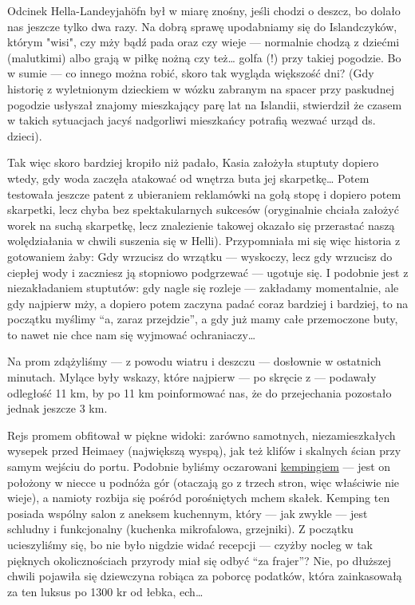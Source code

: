 
Odcinek Hella-Landeyjahöfn był w miarę znośny, jeśli chodzi o deszcz, bo dolało nas jeszcze tylko dwa razy. Na dobrą sprawę upodabniamy się do Islandczyków, którym "wisi", czy mży bądź pada oraz czy wieje --- normalnie chodzą z dziećmi (malutkimi) albo grają w piłkę nożną czy też… golfa (!) przy takiej pogodzie. Bo w sumie --- co innego można robić, skoro tak wygląda większość dni? (Gdy historię z wyletnionym dzieckiem w wózku zabranym na spacer przy paskudnej pogodzie usłyszał znajomy mieszkający parę lat na Islandii, stwierdził że czasem w takich sytuacjach jacyś nadgorliwi mieszkańcy potrafią wezwać urząd ds. dzieci).

Tak więc skoro bardziej kropiło niż padało, Kasia założyła stuptuty dopiero wtedy, gdy woda zaczęła atakować od wnętrza buta jej skarpetkę… Potem testowała jeszcze patent z ubieraniem reklamówki na gołą stopę i dopiero potem skarpetki, lecz chyba bez spektakularnych sukcesów (oryginalnie chciała założyć worek na suchą skarpetkę, lecz znalezienie takowej okazało się przerastać naszą wolędziałania w chwili suszenia się w Helli). Przypomniała mi się więc historia z gotowaniem żaby: Gdy wrzucisz do wrzątku --- wyskoczy, lecz gdy wrzucisz do ciepłej wody i zaczniesz ją stopniowo podgrzewać --- ugotuje się. I podobnie jest z niezakładaniem stuptutów: gdy nagle się rozleje --- zakładamy momentalnie, ale gdy najpierw mży, a dopiero potem zaczyna padać coraz bardziej i bardziej, to na początku myślimy “a, zaraz przejdzie”, a gdy już mamy całe przemoczone buty, to nawet nie chce nam się wyjmować ochraniaczy…

Na prom zdążyliśmy --- z powodu wiatru i deszczu --- dosłownie w ostatnich minutach. Mylące były wskazy, które najpierw --- po skręcie z  --- podawały odległość 11 km, by po 11 km poinformować nas, że do przejechania pozostało jednak jeszcze 3 km.


Rejs promem obfitował w piękne widoki: zarówno samotnych, niezamieszkałych wysepek przed Heimaey (największą wyspą), jak też klifów i skalnych ścian przy samym wejściu do portu. Podobnie byliśmy oczarowani \href{http://www.tjalda.is/en/herjolfsdalur/}{kempingiem} --- jest on położony w niecce u podnóża gór (otaczają go z trzech stron, więc właściwie nie wieje), a namioty rozbija się pośród porośniętych mchem skałek. Kemping ten posiada wspólny salon z aneksem kuchennym, który --- jak zwykle --- jest schludny i funkcjonalny (kuchenka mikrofalowa, grzejniki). Z początku ucieszyliśmy się, bo nie było nigdzie widać recepcji --- czyżby nocleg w tak pięknych okolicznościach przyrody miał się odbyć “za frajer”? Nie, po dłuższej chwili pojawiła się dziewczyna robiąca za poborcę podatków, która zainkasowałą za ten luksus po 1300 kr od łebka, ech…

